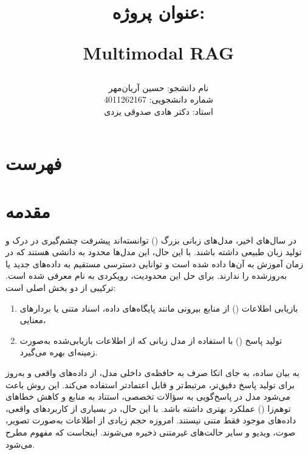 \documentclass{article}
\begin{document}
\title{عنوان پروژه: \\
\begin{LTR}
Multimodal RAG
\end{LTR}}
\author{
نام دانشجو: حسین آریان‌مهر\\
شماره دانشجویی: 4011262167\\
استاد: دکتر هادی صدوقی یزدی
}
\date{}
\maketitle




\newpage
\section{فهرست}

\tableofcontents
\newpage




\section{مقدمه}
در سال‌های اخیر، مدل‌های زبانی بزرگ () توانسته‌اند پیشرفت چشم‌گیری در درک و تولید زبان طبیعی داشته باشند.
با این حال، این مدل‌ها محدود به دانشی هستند که در زمان آموزش به آن‌ها داده شده است و توانایی دسترسی مستقیم به داده‌های جدید یا به‌روزشده را ندارند.
برای حل این محدودیت، رویکردی به نام  معرفی شده است.
 ترکیبی از دو بخش اصلی است:
\begin{enumerate}
\item بازیابی اطلاعات () از منابع بیرونی مانند پایگاه‌های داده، اسناد متنی یا بردارهای معنایی،
\item تولید پاسخ () با استفاده از مدل زبانی که از اطلاعات بازیابی‌شده به‌صورت زمینه‌ای بهره می‌گیرد.
\end{enumerate}

به بیان ساده،  به جای اتکا صرف به حافظه‌ی داخلی مدل، از داده‌های واقعی و به‌روز برای تولید پاسخ دقیق‌تر، مرتبط‌تر و قابل اعتمادتر استفاده می‌کند.
این روش باعث می‌شود مدل در پاسخ‌گویی به سؤالات تخصصی، استناد به منابع و کاهش خطاهای توهم‌زا () عملکرد بهتری داشته باشد.
با این حال، در بسیاری از کاربردهای واقعی، داده‌های موجود فقط متنی نیستند.
امروزه حجم زیادی از اطلاعات به‌صورت تصویر، صوت، ویدیو و سایر حالت‌های غیرمتنی ذخیره می‌شوند.
اینجاست که مفهوم  مطرح می‌شود.
\end{document}
